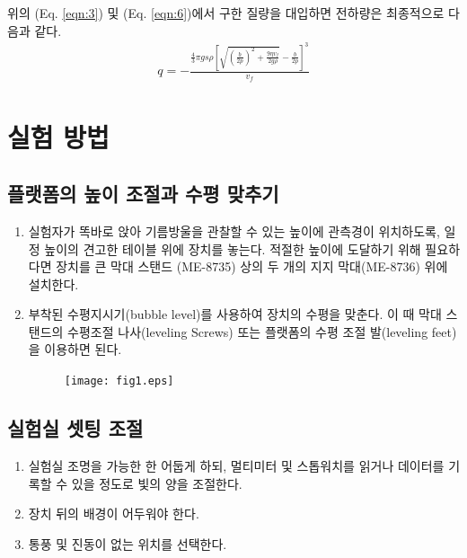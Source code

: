 \documentclass[a4paper, 10pt, nanum]{CSUniSchoolLabReport}
\begin{document}
	위의 (Eq. \ref{eqn:3}) 및 (Eq. \ref{eqn:6})에서 구한 질량을 대입하면 전하량은 최종적으로 다음과 같다.
	\begin{align}
		\label{eqn:9}
		q = - \frac{\frac{4}{3}\pi gs\rho \left[ \sqrt{\left(\frac{b}{2p}\right)^2 + \frac{9\eta v_f}{2g\rho}} - \frac{b}{2p}\right]^3}{v_f}
	\end{align}


\section{실험 방법}

\subsection{플랫폼의 높이 조절과 수평 맞추기}

\begin{enumerate}[label=\arabic*.]
	\item 실험자가 똑바로 앉아 기름방울을 관찰할 수 있는 높이에 관측경이 위치하도록, 일정 높이의 견고한 테이블 위에 장치를 놓는다. 적절한 높이에 도달하기 위해 필요하다면 장치를 큰 막대 스탠드	(ME-8735) 상의 두 개의 지지 막대(ME-8736) 위에 설치한다.
	\item 부착된 수평지시기(bubble level)를 사용하여 장치의 수평을 맞춘다. 이 때 막대 스탠드의 수평조절 나사(leveling Screws) 또는 플랫폼의 수평 조절 발(leveling feet)을 이용하면 된다.
	
	\begin{figure}[htb!]
		\centering
		\texttt{[image: fig1.eps]}
		\caption{}
		\label{fig:1}
	\end{figure}
\end{enumerate}

\subsection{실험실 셋팅 조절}

\begin{enumerate}[label=\arabic*.]
	\item 실험실 조명을 가능한 한 어둡게 하되, 멀티미터 및 스톱워치를 읽거나 데이터를 기록할 수 있을 정도로 빛의 양을 조절한다.
	\item 장치 뒤의 배경이 어두워야 한다.
	\item 통풍 및 진동이 없는 위치를 선택한다.
\end{enumerate}
\end{document}
